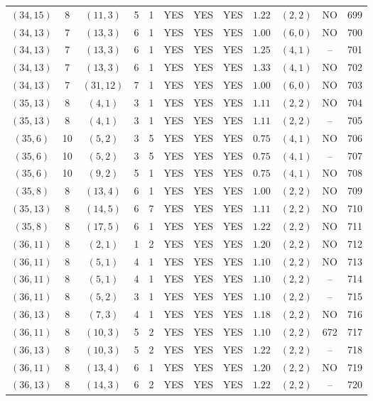 \begin{longtable}{|c|c|c|c|c|c|c|c|c|c|c|c|}
$(34,15)$ & 8 & $(11,3)$ & 5 & 1 & YES & YES & YES & $1.22$ & $(2,2)$ & NO & 699\\
$(34,13)$ & 7 & $(13,3)$ & 6 & 1 & YES & YES & YES & $1.00$ & $(6,0)$ & NO & 700\\
$(34,13)$ & 7 & $(13,3)$ & 6 & 1 & YES & YES & YES & $1.25$ & $(4,1)$ & -- & 701\\
$(34,13)$ & 7 & $(13,3)$ & 6 & 1 & YES & YES & YES & $1.33$ & $(4,1)$ & NO & 702\\
$(34,13)$ & 7 & $(31,12)$ & 7 & 1 & YES & YES & YES & $1.00$ & $(6,0)$ & NO & 703\\
$(35,13)$ & 8 & $(4,1)$ & 3 & 1 & YES & YES & YES & $1.11$ & $(2,2)$ & NO & 704\\
$(35,13)$ & 8 & $(4,1)$ & 3 & 1 & YES & YES & YES & $1.11$ & $(2,2)$ & -- & 705\\
$(35,6)$ & 10 & $(5,2)$ & 3 & 5 & YES & YES & YES & $0.75$ & $(4,1)$ & NO & 706\\
$(35,6)$ & 10 & $(5,2)$ & 3 & 5 & YES & YES & YES & $0.75$ & $(4,1)$ & -- & 707\\
$(35,6)$ & 10 & $(9,2)$ & 5 & 1 & YES & YES & YES & $0.75$ & $(4,1)$ & NO & 708\\
$(35,8)$ & 8 & $(13,4)$ & 6 & 1 & YES & YES & YES & $1.00$ & $(2,2)$ & NO & 709\\
$(35,13)$ & 8 & $(14,5)$ & 6 & 7 & YES & YES & YES & $1.11$ & $(2,2)$ & NO & 710\\
$(35,8)$ & 8 & $(17,5)$ & 6 & 1 & YES & YES & YES & $1.22$ & $(2,2)$ & NO & 711\\
$(36,11)$ & 8 & $(2,1)$ & 1 & 2 & YES & YES & YES & $1.20$ & $(2,2)$ & NO & 712\\
$(36,11)$ & 8 & $(5,1)$ & 4 & 1 & YES & YES & YES & $1.10$ & $(2,2)$ & NO & 713\\
$(36,11)$ & 8 & $(5,1)$ & 4 & 1 & YES & YES & YES & $1.10$ & $(2,2)$ & -- & 714\\
$(36,11)$ & 8 & $(5,2)$ & 3 & 1 & YES & YES & YES & $1.10$ & $(2,2)$ & -- & 715\\
$(36,13)$ & 8 & $(7,3)$ & 4 & 1 & YES & YES & YES & $1.18$ & $(2,2)$ & NO & 716\\
$(36,11)$ & 8 & $(10,3)$ & 5 & 2 & YES & YES & YES & $1.10$ & $(2,2)$ & 672 & 717\\
$(36,13)$ & 8 & $(10,3)$ & 5 & 2 & YES & YES & YES & $1.22$ & $(2,2)$ & -- & 718\\
$(36,11)$ & 8 & $(13,4)$ & 6 & 1 & YES & YES & YES & $1.20$ & $(2,2)$ & NO & 719\\
$(36,13)$ & 8 & $(14,3)$ & 6 & 2 & YES & YES & YES & $1.22$ & $(2,2)$ & -- & 720\\

\end{longtable}
